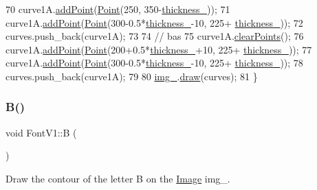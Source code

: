 \begin{DoxyCode}
70     curve1A.\mbox{\hyperlink{class_bezier_curve_a38d16c18b36ae45619b05e26e226cf34}{addPoint}}(\mbox{\hyperlink{class_point}{Point}}(250, 350-\mbox{\hyperlink{class_font_v1_aed8040e76be9a52833627b92f0fb4e5f}{thickness\_}}));
71     curve1A.\mbox{\hyperlink{class_bezier_curve_a38d16c18b36ae45619b05e26e226cf34}{addPoint}}(\mbox{\hyperlink{class_point}{Point}}(300-0.5*\mbox{\hyperlink{class_font_v1_aed8040e76be9a52833627b92f0fb4e5f}{thickness\_}}-10, 225+
      \mbox{\hyperlink{class_font_v1_aed8040e76be9a52833627b92f0fb4e5f}{thickness\_}}));
72     curves.push\_back(curve1A);
73 
74     \textcolor{comment}{// bas}
75     curve1A.\mbox{\hyperlink{class_bezier_curve_a0ba8ce66d5af5971ae6a1b506029728e}{clearPoints}}();
76     curve1A.\mbox{\hyperlink{class_bezier_curve_a38d16c18b36ae45619b05e26e226cf34}{addPoint}}(\mbox{\hyperlink{class_point}{Point}}(200+0.5*\mbox{\hyperlink{class_font_v1_aed8040e76be9a52833627b92f0fb4e5f}{thickness\_}}+10, 225+
      \mbox{\hyperlink{class_font_v1_aed8040e76be9a52833627b92f0fb4e5f}{thickness\_}}));
77     curve1A.\mbox{\hyperlink{class_bezier_curve_a38d16c18b36ae45619b05e26e226cf34}{addPoint}}(\mbox{\hyperlink{class_point}{Point}}(300-0.5*\mbox{\hyperlink{class_font_v1_aed8040e76be9a52833627b92f0fb4e5f}{thickness\_}}-10, 225+
      \mbox{\hyperlink{class_font_v1_aed8040e76be9a52833627b92f0fb4e5f}{thickness\_}}));
78     curves.push\_back(curve1A);
79 
80     \mbox{\hyperlink{class_font_v1_a00569e3e3c4b70f437b63f396f735fb0}{img\_}}.\mbox{\hyperlink{class_image_a8d162f3cab956131d58708c09aa560b0}{draw}}(curves);
81 \}
\end{DoxyCode}
\mbox{\label{class_font_v1_a620ee7876d479807f73481f27be48f2a}} 
\subsubsection{\texorpdfstring{B()}{B()}}
{\footnotesize\ttfamily void Font\+V1\+::B (\begin{DoxyParamCaption}{ }\end{DoxyParamCaption})}



Draw the contour of the letter B on the \mbox{\hyperlink{class_image}{Image}} img\+\_\+. 


